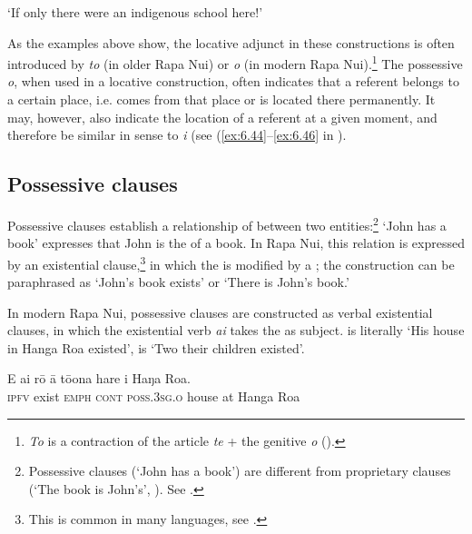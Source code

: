 \glt
‘If only there were an indigenous school here!’ \textstyleExampleref{[R242.061]} 
\z

As the examples above show, the locative adjunct in these constructions is often introduced by \textit{to} (in older Rapa Nui) or \textit{o} (in modern Rapa Nui).\footnote{\label{fn:475}\textit{To} is a contraction of the article \textit{te} + the genitive  \textit{o} ().} The possessive  \textit{o}, when used in a locative construction, often indicates that a referent belongs to a certain place, i.e. comes from that place or is located there permanently. It may, however, also indicate the location of a referent at a given moment, and therefore be similar in sense to \textit{{\ꞌ}i} (see (\ref{ex:6.44}–\ref{ex:6.46} in ).

\subsection{Possessive clauses}\label{sec:9.3.3}
Possessive clauses establish a relationship of  between two entities:\footnote{\label{fn:476}Possessive clauses (‘John has a book’) are different from proprietary clauses (‘The book is John’s’, ). See \citet{Clark1969}.}  ‘John has a book’ expresses that John is the  of a book. In Rapa Nui, this relation is expressed by an existential clause,\footnote{\label{fn:477}This is common in many languages, see \citet[244]{Dryer2007Clause}.} in which the   is modified by a ; the construction can be paraphrased as ‘John’s book exists’ or ‘There is John’s book.’

In modern Rapa Nui, possessive clauses are constructed as verbal existential clauses, in which the existential verb \textit{ai} takes the  as subject.  is literally ‘His house in Hanga Roa existed’,  is ‘Two their children existed’.

\ea\label{ex:9.70}
\gll E ai rō {\ꞌ}ā tō{\ꞌ}ona hare {\ꞌ}i Haŋa Roa. \\
\textsc{ipfv} exist \textsc{emph} \textsc{cont} \textsc{poss.3sg.o} house at Hanga Roa \\

